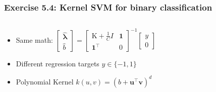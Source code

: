 \documentclass[10pt,aspectratio=169,handout]{beamer}
\begin{document}
\begin{frame}
    \frametitle{Exercise 5.4: Kernel SVM for binary classification}

    \begin{columns}
    \begin{column}{0.5\textwidth}
    \begin{itemize}
        \item Same math: $\begin{bmatrix} \boldsymbol{\hat{\lambda}} \\ \hat{b} \end{bmatrix} = \begin{bmatrix}\text{K} + \frac{1}{C}I & \boldsymbol{1} \\ \boldsymbol{1}^\intercal & 0\end{bmatrix}^{-1} \begin{bmatrix} y \\ 0 \end{bmatrix} $
        \item Different regression targets $y \in \{-1, 1\}$
        \item Polynomial Kernel $k(u, v) = (b + \boldsymbol{u}^\intercal\boldsymbol{v})^{d}$
    \end{itemize}
    \end{column}

    \begin{column}{0.5\textwidth}
        \inputminted[bgcolor=LightGray,fontsize=\small]{python}{code/svm.py}
    \end{column}
    \end{columns}
\end{frame}
\end{document}
